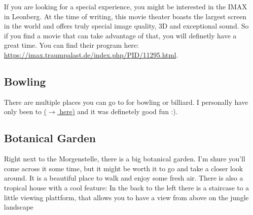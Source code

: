If you are looking for a special experience, you might be interested in the IMAX in Leonberg. At the time of writing, this movie theater boasts the largest screen in the world and offers truly special image quality, 3D and exceptional sound. So if you find a movie that can take advantage of that, you will definetly have a great time. You can find their program here: \url{https://imax.traumpalast.de/index.php/PID/11295.html}.

\subsection{Bowling}
There are multiple places you can go to for bowling or billiard. I personally have only been to  \href{https://maps.app.goo.gl/dgMVABnYTJC7qGBT8}{($\xrightarrow{}$ here)} and it was definetely good fun :). 

\subsection{Botanical Garden}
Right next to the Morgenstelle, there is a big botanical garden. I'm shure you'll come across it some time, but it might be worth it to go and take a closer look around. It is a beautiful place to walk and enjoy some fresh air. There is also a tropical house with a cool feature: In the back to the left there is a staircase to a little viewing plattform, that allows you to have a view from above on the jungle landscape
